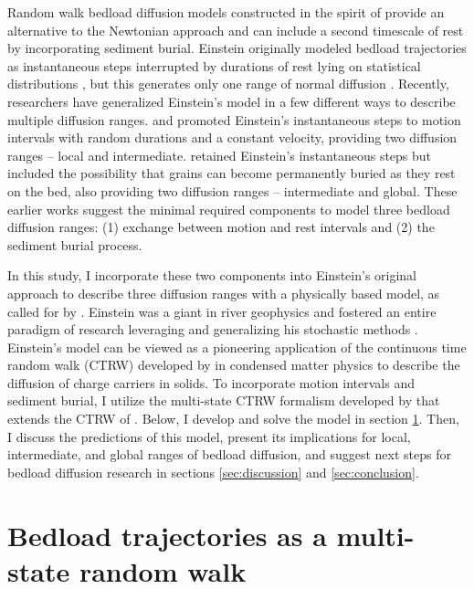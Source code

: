 Random walk bedload diffusion models constructed in the spirit of \citet{Einstein1937} provide an alternative to the Newtonian approach and can include a second timescale of rest by incorporating sediment burial.
Einstein originally modeled bedload trajectories as instantaneous steps interrupted by durations of rest lying on statistical distributions \citep{Hassan1991}, but this generates only one range of normal diffusion \citep{Einstein1937,Hubbell1964,Nakagawa1976}.
Recently, researchers have generalized Einstein's model in a few different ways to describe multiple diffusion ranges.
\citet{Lisle1998} and \citet{Lajeunesse2017} promoted Einstein's instantaneous steps to motion intervals with random durations and a constant velocity, providing two diffusion ranges -- local and intermediate.
\citet{Wu2019} retained Einstein's instantaneous steps but included the possibility that grains can become permanently buried as they rest on the bed, also providing two diffusion ranges -- intermediate and global. 
These earlier works suggest the minimal required components to model three bedload diffusion ranges: (1) exchange between motion and rest intervals and (2) the sediment burial process.

In this study, I incorporate these two components into Einstein's original approach to describe three diffusion ranges with a physically based model, as called for by \citet{Nikora2002}.
Einstein was a giant in river geophysics and fostered an entire paradigm of research leveraging and generalizing his stochastic methods \citep{Hubbell1964, Yano1969, Yang1971, Gordon1972, Nakagawa1976,Paintal1971}.
Einstein's model can be viewed as a pioneering application of the continuous time random walk (CTRW) developed by \citet{Montroll1965} in condensed matter physics to describe the diffusion of charge carriers in solids.
To incorporate motion intervals and sediment burial, I utilize the multi-state CTRW formalism developed by \citet{Weiss1976, Weiss1994} that extends the CTRW of \citet{Montroll1965}.
Below, I develop and solve the model in section \ref{sec:model}. Then, I discuss the predictions of this model, present its implications for local, intermediate, and global ranges of bedload diffusion, and suggest next steps for bedload diffusion research in sections \ref{sec:discussion} and \ref{sec:conclusion}.

\section{Bedload trajectories as a multi-state random walk}
\label{sec:model}

